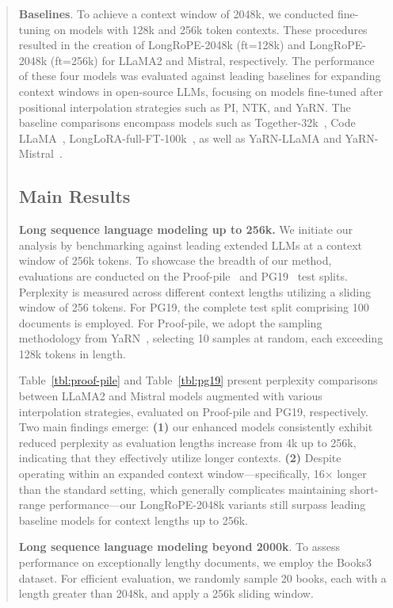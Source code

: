 \begin{abstract}
\textbf{Baselines}. To achieve a context window of 2048k, we conducted fine-tuning on models with 128k and 256k token contexts. These procedures resulted in the creation of LongRoPE-2048k (ft=128k) and LongRoPE-2048k (ft=256k) for LLaMA2 and Mistral, respectively. The performance of these four models was evaluated against leading baselines for expanding context windows in open-source LLMs, focusing on models fine-tuned after positional interpolation strategies such as PI, NTK, and YaRN. The baseline comparisons encompass models such as Together-32k~\cite{together}, Code LLaMA~\cite{codellama}, LongLoRA-full-FT-100k~\cite{longlora}, as well as YaRN-LLaMA and YaRN-Mistral~\cite{yarn}.

\subsection{Main Results}

\label{sec:mainresult}
\textbf{Long sequence language modeling up to 256k.} We initiate our analysis by benchmarking against leading extended LLMs at a context window of 256k tokens. To showcase the breadth of our method, evaluations are conducted on the Proof-pile~\cite{pg19} and PG19~\cite{pile} test splits. Perplexity is measured across different context lengths utilizing a sliding window of 256 tokens. For PG19, the complete test split comprising 100 documents is employed. For Proof-pile, we adopt the sampling methodology from YaRN~\cite{yarn}, selecting 10 samples at random, each exceeding 128k tokens in length.

Table~\ref{tbl:proof-pile} and Table~\ref{tbl:pg19} present perplexity comparisons between LLaMA2 and Mistral models augmented with various interpolation strategies, evaluated on Proof-pile and PG19, respectively. Two main findings emerge: \textbf{(1)} our enhanced models consistently exhibit reduced perplexity as evaluation lengths increase from 4k up to 256k, indicating that they effectively utilize longer contexts. \textbf{(2)} Despite operating within an expanded context window—specifically, 16$\times$ longer than the standard setting, which generally complicates maintaining short-range performance—our LongRoPE-2048k variants still surpass leading baseline models for context lengths up to 256k.

\textbf{Long sequence language modeling beyond 2000k}. To assess performance on exceptionally lengthy documents, we employ the Books3~\cite{pile} dataset. For efficient evaluation, we randomly sample 20 books, each with a length greater than 2048k, and apply a 256k sliding window.


\end{abstract}
